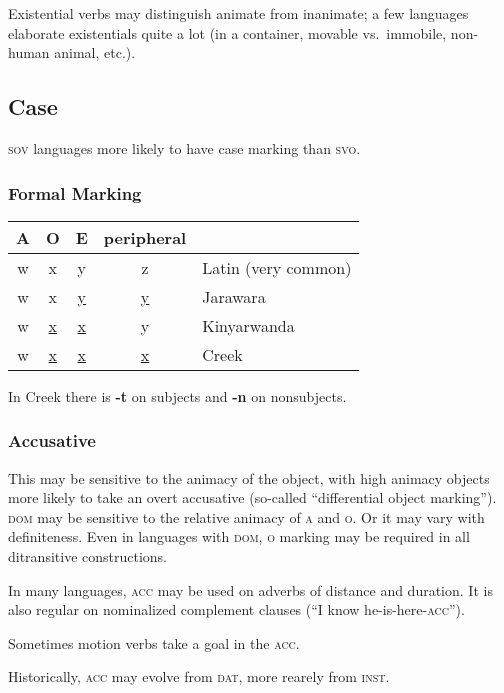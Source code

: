 \documentclass[11pt]{article}
\newcommand{\LL}[1]{\textbf{#1}}  %
\newcommand{\I}[1]{\textsc{#1}}   %
\begin{document}
Existential verbs may distinguish animate from inanimate; a few
languages elaborate existentials quite a lot (in a container, movable
vs.\ immobile, non-human animal, etc.).


\subsection{Case}
\I{sov} languages more likely to have case marking than \I{svo}.

\subsubsection{Formal Marking}
\begin{center}
  \begin{tabular}{ccccl}
    A & O & E & peripheral \\
    \hline
    w & x & y & z & Latin (very common) \\
    w & x & \uline{y} & \uline{y} & Jarawara \\
    w & \uline{x} & \uline{x} & y & Kinyarwanda \\
    w & \uline{x} & \uline{x} & \uline{x} & Creek
  \end{tabular}
\end{center}

\noindent In Creek there is \LL{-t} on subjects and \LL{-n} on
nonsubjects. 

\subsubsection{Accusative} This may be sensitive to the animacy of the
object, with high animacy objects more likely to take an overt
accusative (so-called ``differential object marking'').  \I{dom} may
be sensitive to the relative animacy of \I{a} and \I{o}.  Or it may
vary with definiteness.  Even in languages with \I{dom}, \I{o} marking
may be required in all ditransitive constructions.

In many languages, \I{acc} may be used on adverbs of distance and
duration.  It is also regular on nominalized complement clauses (``I
know he-is-here-\I{acc}'').

Sometimes motion verbs take a goal in the \I{acc}.

Historically, \I{acc} may evolve from \I{dat}, more rearely from
\I{inst}. 

\end{document}
